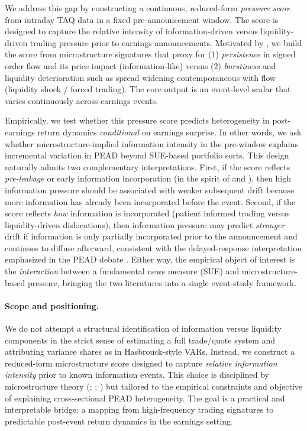 We address this gap by constructing a continuous, reduced-form \emph{pressure score} from intraday
TAQ data in a fixed pre-announcement window. The score is designed to capture the relative intensity
of information-driven versus liquidity-driven trading pressure prior to earnings announcements. %
Motivated by \citet{Hasbrouck1991}, we build the score from microstructure signatures that proxy for
(1) \emph{persistence} in signed order flow and its price impact (information-like) versus
(2) \emph{burstiness} and liquidity deterioration such as spread widening contemporaneous with flow
(liquidity shock / forced trading). The core output is an event-level scalar that varies continuously
across earnings events.

Empirically, we test whether this pressure score predicts heterogeneity in post-earnings return dynamics
\emph{conditional} on earnings surprise. In other words, we ask whether microstructure-implied
information intensity in the pre-window explains incremental variation in PEAD beyond SUE-based
portfolio sorts. This design naturally admits two complementary interpretations.
First, if the score reflects \emph{pre-leakage} or early information incorporation (in the spirit of
\citet{Kyle1985} and \citet{Hasbrouck1991}), then high information pressure should be associated with
weaker subsequent drift because more information has already been incorporated before the event.
Second, if the score reflects \emph{how} information is incorporated (patient informed trading versus
liquidity-driven dislocations), then information pressure may predict \emph{stronger} drift if
information is only partially incorporated prior to the announcement and continues to diffuse afterward,
consistent with the delayed-response interpretation emphasized in the PEAD debate \citep{BernardThomas1989}.
Either way, the empirical object of interest is the \emph{interaction} between a fundamental news measure
(SUE) and microstructure-based pressure, bringing the two literatures into a single event-study framework.

\paragraph{Scope and positioning.}
We do not attempt a structural identification of information versus liquidity components in the strict
sense of estimating a full trade/quote system and attributing variance shares as in Hasbrouck-style VARs.
Instead, we construct a reduced-form microstructure score designed to capture \emph{relative information
intensity} prior to known information events. This choice is disciplined by microstructure theory
(\citealp{Kyle1985}; \citealp{GlostenMilgrom1985}; \citealp{Hasbrouck1991}) but tailored to the empirical
constraints and objective of explaining cross-sectional PEAD heterogeneity. The goal is a practical
and interpretable bridge: a mapping from high-frequency trading signatures to predictable post-event
return dynamics in the earnings setting.

